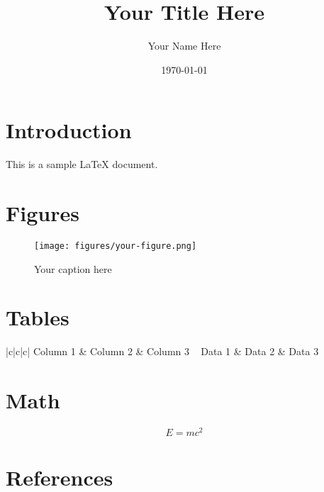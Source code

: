 \documentclass{article}
\title{Your Title Here}
\author{Your Name Here}
\date{\today}
\begin{document}
\maketitle
\section{Introduction}
This is a sample LaTeX document.
\section{Figures}

\begin{figure}[h]
    \centering
    \texttt{[image: figures/your-figure.png]}
    \caption{Your caption here}
    \label{fig:your-label}
\end{figure}
\section{Tables}
\begin{table}[h]
    \centering
    \begin{tabular}{|c|c|c|}
        \hline
        Column 1 & Column 2 & Column 3 \
        \hline
        Data 1   & Data 2   & Data 3   \
        \hline
    \end{tabular}
    \caption{Your caption here}
    \label{tab:your-label}
\end{table}
\section{Math}
\begin{equation}
    E = mc^2
\end{equation}
\section{References}


\end{document}
